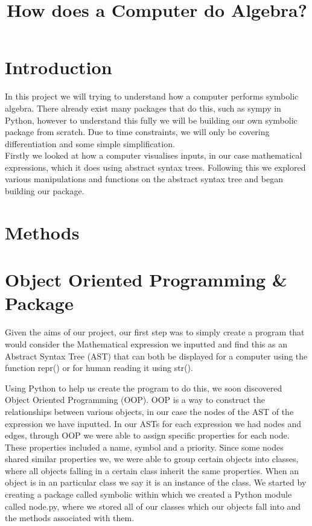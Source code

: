 \documentclass[12pt]{article}
\author{}
\title{\textbf{How does a Computer do Algebra?}}
\date{}
\newcommand\blankpage{
    \null
    \thispagestyle{empty}
    \newpage
    }
\begin{document}
\afterpage{\blankpage}

\maketitle
\newpage

\afterpage{\blankpage}
\tableofcontents



\newpage




\section{Introduction}
In this project we will trying to understand how a computer performs symbolic algebra. There already exist many packages that do this, such as sympy in Python, however to understand this fully we will be building our own symbolic package from scratch. Due to time constraints, we will only be covering differentiation and some simple simplification.\\
Firstly we looked at how a computer visualises inputs, in our case mathematical expressions, which it does using abstract syntax trees. Following this we explored various manipulations and functions on the abstract syntax tree and began building our package.


\section{Methods}


\section{Object Oriented Programming \& Package}

Given the aims of our project, our first step was to simply create a program that would consider the Mathematical expression we inputted and find this as an Abstract Syntax Tree (AST) that can both be displayed for a computer using the function repr() or for human reading it using str(). 

Using Python to help us create the program to do this, we soon discovered Object Oriented Programming (OOP). OOP is a way to construct the relationships between various objects, in our case the nodes of the AST of the expression we have inputted. In our ASTs for each expression we had nodes and edges, through OOP we were able to assign specific properties for each node. These properties included a name, symbol and a priority. Since some nodes shared similar properties we, we were able to group certain objects into classes, where all objects falling in a certain class inherit the same properties. When an object is in an particular class we say it is an instance of the class. We started by creating a package called symbolic within which we created a Python module called node.py, where we stored all of our classes which our objects fall into and the methods associated with them. 
\end{document}
